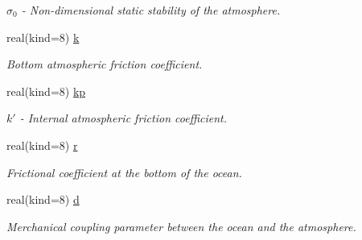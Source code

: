 \begin{DoxyCompactItemize}
\begin{DoxyCompactList}\small\item\em $\sigma_0$ -\/ Non-\/dimensional static stability of the atmosphere. \end{DoxyCompactList}\item 
\mbox{\label{structparams_1_1physicsconfiguration_a36908c48ae05a24144bd0e423ae5649d}} 
real(kind=8) \hyperlink{structparams_1_1physicsconfiguration_a36908c48ae05a24144bd0e423ae5649d}{k}
\begin{DoxyCompactList}\small\item\em Bottom atmospheric friction coefficient. \end{DoxyCompactList}\item 
\mbox{\label{structparams_1_1physicsconfiguration_a3f749ea7cb88e2e1f0281db2a04469ff}} 
real(kind=8) \hyperlink{structparams_1_1physicsconfiguration_a3f749ea7cb88e2e1f0281db2a04469ff}{kp}
\begin{DoxyCompactList}\small\item\em $k'$ -\/ Internal atmospheric friction coefficient. \end{DoxyCompactList}\item 
\mbox{\label{structparams_1_1physicsconfiguration_a377f59134e3a6eea87b29374bf699fbd}} 
real(kind=8) \hyperlink{structparams_1_1physicsconfiguration_a377f59134e3a6eea87b29374bf699fbd}{r}
\begin{DoxyCompactList}\small\item\em Frictional coefficient at the bottom of the ocean. \end{DoxyCompactList}\item 
\mbox{\label{structparams_1_1physicsconfiguration_a169d961f4a348a0d84e03d51938e98dc}} 
real(kind=8) \hyperlink{structparams_1_1physicsconfiguration_a169d961f4a348a0d84e03d51938e98dc}{d}
\begin{DoxyCompactList}\small\item\em Merchanical coupling parameter between the ocean and the atmosphere. \end{DoxyCompactList}\item 
\mbox{\label{structparams_1_1physicsconfiguration_a4963cc62487d1aca126ef12e4c890e73}} 

\end{DoxyCompactItemize}
